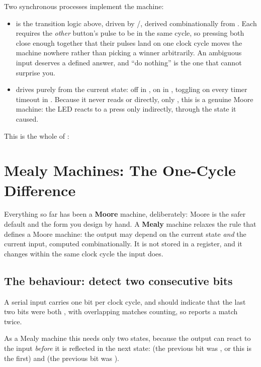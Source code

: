 Two synchronous processes implement the machine:
\begin{itemize}
  \item {} is the  transition logic above, driven by
    /\allowbreak{}, derived combinationally from
    .
    Each requires the \emph{other} button's pulse to be  in the same cycle, so pressing
    both close enough together that their pulses land on one clock cycle moves the machine nowhere
    rather than picking a winner arbitrarily. An ambiguous input deserves a defined answer, and
    ``do nothing'' is the one that cannot surprise you.
  \item {} drives  purely from the current state: off in
    , on in , toggling on every timer timeout in .
    Because it never reads  or  directly, only ,
    this is a genuine Moore machine: the LED reacts to a press only indirectly, through the state it
    caused.
\end{itemize}
This is the whole of :


\section{Mealy Machines: The One-Cycle Difference}
\label{c8:a5}
Everything so far has been a \textbf{Moore} machine, deliberately: Moore is the safer default and
the form you design by hand. A \textbf{Mealy} machine relaxes the rule that defines a Moore machine:
the output may depend on the current state \emph{and} the current input, computed combinationally.
It is not stored in a register, and it changes within the same clock cycle the input does.

\subsection{The behaviour: detect two consecutive  bits}
\label{c8:mealydetect}
A serial input  carries one bit per clock cycle, and  should indicate that the
last two bits were both , with overlapping matches counting, so  reports a match
twice.

As a Mealy machine this needs only two states, because the output can react to the input
\emph{before} it is reflected in the next state:  (the previous bit was ,
or this is the first) and  (the previous bit was ).

